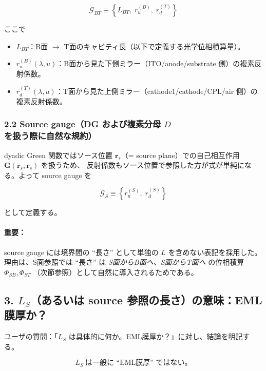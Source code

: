 \begin{equation}
\boxed{
\mathcal{G}_{BT}
\equiv
\left\{
L_{BT},\; r_u^{(B)},\; r_d^{(T)}
\right\}
}
\end{equation}

ここで

\begin{itemize}
\item \(L_{BT}\)：B面 \(\rightarrow\) T面のキャビティ長（以下で定義する光学位相積算量）。
\item \(r_u^{(B)}(\lambda,u)\)：B面から見た下側ミラー（ITO/anode/substrate 側）の複素反射係数。
\item \(r_d^{(T)}(\lambda,u)\)：T面から見た上側ミラー（cathode1/cathode/CPL/air 側）の複素反射係数。
\end{itemize}

\subsubsection*{2.2 Source gauge（DG および複素分母 \(D\) を扱う際に自然な規約）}

dyadic Green 関数ではソース位置 \(\mathbf{r}_s\)（= source plane）での自己相互作用
\(\mathbf{G}(\mathbf{r}_s,\mathbf{r}_s)\) を扱うため、
反射係数もソース位置で参照した方が式が単純になる。よって source gauge を

\begin{equation}
\boxed{
\mathcal{G}_{S}
\equiv
\left\{
r_u^{(S)},\; r_d^{(S)}
\right\}
}
\end{equation}

として定義する。

\paragraph{重要：}
source gauge には境界間の ``長さ'' として単独の \(L\) を含めない表記を採用した。
理由は、S面参照では ``長さ'' は
\emph{S面からB面へ、S面からT面へ} の位相積算 \(\Phi_{SB}, \Phi_{ST}\)
（次節参照）として自然に導入されるためである。

\subsection*{3. \(L_S\)（あるいは source 参照の長さ）の意味：EML膜厚か？}

ユーザの質問：「\(L_S\) は具体的に何か。EML膜厚か？」に対し、結論を明記する。

\begin{equation}
\boxed{
L_S\ \text{は一般に ``EML膜厚'' ではない。}
}
\end{equation}

